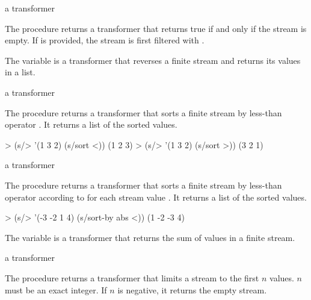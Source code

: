 \begin{procedure}
\end{procedure}
\returns{} a transformer

The  procedure returns a transformer that returns true if and only if
the stream is empty. If  is provided, the stream is first filtered
with .

\begin{variable}
\end{variable}
\antipar

The  variable is a transformer that reverses a finite stream and returns
its values in a list.

\begin{procedure}
\end{procedure}
\returns{} a transformer


The  procedure returns a transformer that sorts a finite stream by less-than
operator . It returns a list of the sorted values.

\codebegin
> (s/> '(1 3 2) (s/sort <))
(1 2 3)
> (s/> '(1 3 2) (s/sort >))
(3 2 1)
\codeend

\begin{procedure}
\end{procedure}
\returns{} a transformer

The  procedure returns a transformer that sorts a finite stream by
less-than operator  according to  for each stream
value . It returns a list of the sorted values.

\codebegin
> (s/> '(-3 -2 1 4) (s/sort-by abs <))
(1 -2 -3 4)
\codeend

\begin{variable}
\end{variable}
\antipar

The  variable is a transformer that returns the sum of values in a finite
stream.

\begin{procedure}
\end{procedure}
\returns{} a transformer

The  procedure returns a transformer that limits a stream to the first $n$
values. $n$ must be an exact integer. If $n$ is negative, it returns the empty stream.

